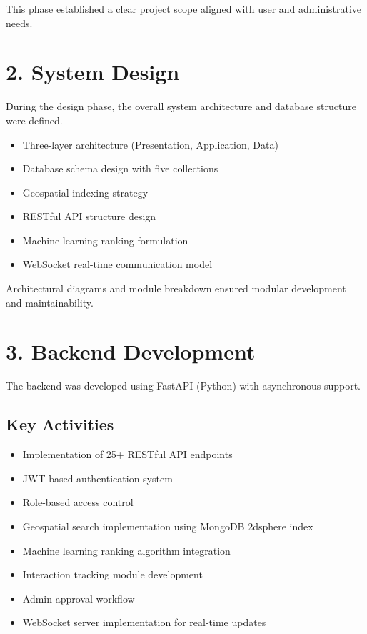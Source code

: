 \documentclass[12pt,a4paper]{report}
\begin{document}
This phase established a clear project scope aligned with user and administrative needs.

\section{2. System Design}

During the design phase, the overall system architecture and database structure were defined.

\begin{itemize}

\item Three-layer architecture (Presentation, Application, Data)

\item Database schema design with five collections

\item Geospatial indexing strategy

\item RESTful API structure design

\item Machine learning ranking formulation

\item WebSocket real-time communication model

\end{itemize}

Architectural diagrams and module breakdown ensured modular development and maintainability.

\section{3. Backend Development}

The backend was developed using FastAPI (Python) with asynchronous support.

\subsection*{Key Activities}

\begin{itemize}

\item Implementation of 25+ RESTful API endpoints

\item JWT-based authentication system

\item Role-based access control

\item Geospatial search implementation using MongoDB 2dsphere index

\item Machine learning ranking algorithm integration

\item Interaction tracking module development

\item Admin approval workflow

\item WebSocket server implementation for real-time updates

\end{itemize}
\end{document}
